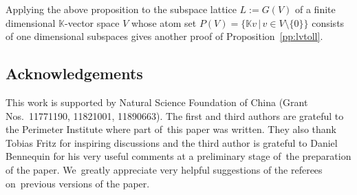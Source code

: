 \documentclass[10pt,a4paper]{amsart}
\numberwithin{equation}{section}
\newcommand{\K}{\mathbb{K}}
\begin{document}
\begin{Remark}
Applying the above proposition to the subspace lattice $L:=G(V)$ of a finite dimensional $\K$-vector space $V$ whose atom set $P(V)=\{\K v\,|\, v\in V\setminus \{0\}\}$ consists of one dimensional subspaces gives another proof of Proposition~\ref{pp:lvtoll}.
\end{Remark}

{\sloppy\subsection*{Acknowledgements} This work is supported by Natural Science Foundation of China (Grant Nos.\ 11771190, 11821001, 11890663). The first and third authors are grateful to the Perimeter Institute where part of~this paper was written.
They also thank Tobias Fritz for inspiring discussions {and the third author is grateful to Daniel Bennequin for his very useful comments at a preliminary stage of~the preparation of the paper}. We~greatly appreciate very helpful suggestions of the referees on~previous versions of the paper.

}

\end{document}
